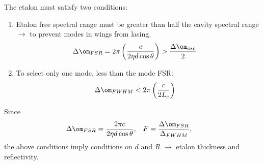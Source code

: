 \documentclass[a4paper, 11pt, normalem]{report}
\begin{document}
The etalon must satisfy two conditions:
\begin{enumerate}
    \item Etalon free spectral range must be greater than half the cavity spectral range $\to$ to prevent modes in wings from lasing.
        \begin{align}
            \Delta\om_{FSR} &= 2\pi\left(\frac{c}{2\eta d\cos\theta}\right) > \frac{\Delta\om_{osc}}{2}
        \end{align}
    \item To select only one mode, less than the mode FSR:
        \begin{align}
            \Delta\om_{FWHM} &< 2\pi\left(\frac{c}{2L_c}\right)
        \end{align}
\end{enumerate}
Since
\begin{align}
    \Delta\om_{FSR} &= \frac{2\pi c}{2\eta d\cos\theta}, & F &= \frac{\Delta\om_{FSR}}{\Delta_{FWHM}},
\end{align}
the above conditions imply conditions on $d$ and $R$ $\to$ etalon thickness and reflectivity.
\end{document}

